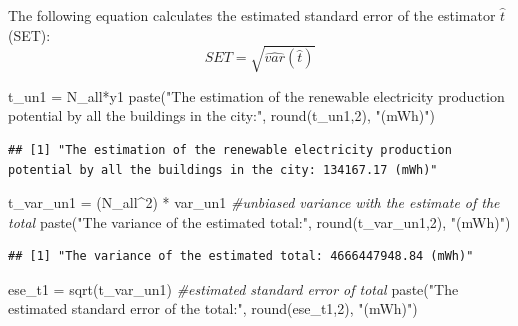 \documentclass[
]{book}
\newenvironment{Shaded}{\begin{snugshade}}{\end{snugshade}}
\newcommand{\CommentTok}[1]{\textcolor[rgb]{0.56,0.35,0.01}{\textit{#1}}}
\newcommand{\DecValTok}[1]{\textcolor[rgb]{0.00,0.00,0.81}{#1}}
\newcommand{\FunctionTok}[1]{\textcolor[rgb]{0.00,0.00,0.00}{#1}}
\newcommand{\NormalTok}[1]{#1}
\newcommand{\OtherTok}[1]{\textcolor[rgb]{0.56,0.35,0.01}{#1}}
\newcommand{\SpecialCharTok}[1]{\textcolor[rgb]{0.00,0.00,0.00}{#1}}
\newcommand{\StringTok}[1]{\textcolor[rgb]{0.31,0.60,0.02}{#1}}
\begin{document}
The following equation calculates the estimated standard error of the estimator \(\hat{t}\) (SET):
\begin{equation} 
  SET = \sqrt{\hat{var}(\hat{t})} \label{eq:set}
\end{equation}

\begin{Shaded}
\begin{Highlighting}[]
\NormalTok{t\_un1 }\OtherTok{=}\NormalTok{ N\_all}\SpecialCharTok{*}\NormalTok{y1 }
\FunctionTok{paste}\NormalTok{(}\StringTok{"The estimation of the renewable electricity production potential by all the buildings in the city:"}\NormalTok{, }\FunctionTok{round}\NormalTok{(t\_un1,}\DecValTok{2}\NormalTok{), }\StringTok{"(mWh)"}\NormalTok{)}
\end{Highlighting}
\end{Shaded}

\begin{verbatim}
## [1] "The estimation of the renewable electricity production potential by all the buildings in the city: 134167.17 (mWh)"
\end{verbatim}

\begin{Shaded}
\begin{Highlighting}[]
\NormalTok{t\_var\_un1 }\OtherTok{=}\NormalTok{ (N\_all}\SpecialCharTok{\^{}}\DecValTok{2}\NormalTok{) }\SpecialCharTok{*}\NormalTok{ var\_un1 }\CommentTok{\#unbiased variance with the estimate of the total}
\FunctionTok{paste}\NormalTok{(}\StringTok{"The variance of the estimated total:"}\NormalTok{, }\FunctionTok{round}\NormalTok{(t\_var\_un1,}\DecValTok{2}\NormalTok{), }\StringTok{"(mWh)"}\NormalTok{)}
\end{Highlighting}
\end{Shaded}

\begin{verbatim}
## [1] "The variance of the estimated total: 4666447948.84 (mWh)"
\end{verbatim}

\begin{Shaded}
\begin{Highlighting}[]
\NormalTok{ese\_t1 }\OtherTok{=} \FunctionTok{sqrt}\NormalTok{(t\_var\_un1) }\CommentTok{\#estimated standard error of total}
\FunctionTok{paste}\NormalTok{(}\StringTok{"The estimated standard error of the total:"}\NormalTok{, }\FunctionTok{round}\NormalTok{(ese\_t1,}\DecValTok{2}\NormalTok{), }\StringTok{"(mWh)"}\NormalTok{)}
\end{Highlighting}
\end{Shaded}
\end{document}

